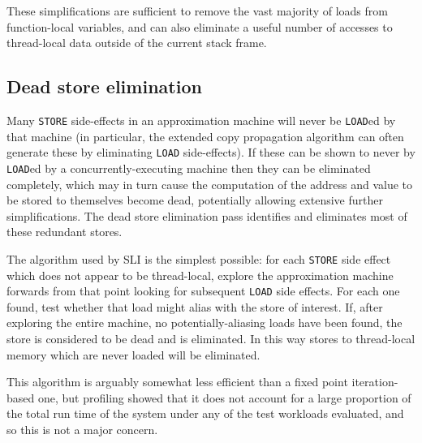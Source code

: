 \documentclass[12pt,a4paper]{book}
\begin{document}
These simplifications are sufficient to remove the vast majority of loads from function-local variables, and can also eliminate a useful number of accesses to thread-local data outside of the current stack frame.



\subsection{Dead store elimination}
Many \verb|STORE| side-effects in an approximation machine will never be \verb|LOAD|ed by that machine (in particular, the extended copy propagation algorithm can often generate these by eliminating \verb|LOAD| side-effects).
If these can be shown to never by \verb|LOAD|ed by a concurrently-executing machine then they can be eliminated completely, which may in turn cause the computation of the address and value to be stored to themselves become dead, potentially allowing extensive further simplifications.
The dead store elimination pass identifies and eliminates most of these redundant stores.


The algorithm used by SLI is the simplest possible: for each \verb|STORE| side effect which does not appear to be thread-local, explore the approximation machine forwards from that point looking for subsequent \verb|LOAD| side effects.
For each one found, test whether that load might alias with the store of interest.
If, after exploring the entire machine, no potentially-aliasing loads have been found, the store is considered to be dead and is eliminated.
In this way stores to thread-local memory which are never loaded will be eliminated.

This algorithm is arguably somewhat less efficient than a fixed point iteration-based one, but profiling showed that it does not account for a large proportion of the total run time of the system under any of the test workloads evaluated, and so this is not a major concern.
\end{document}
